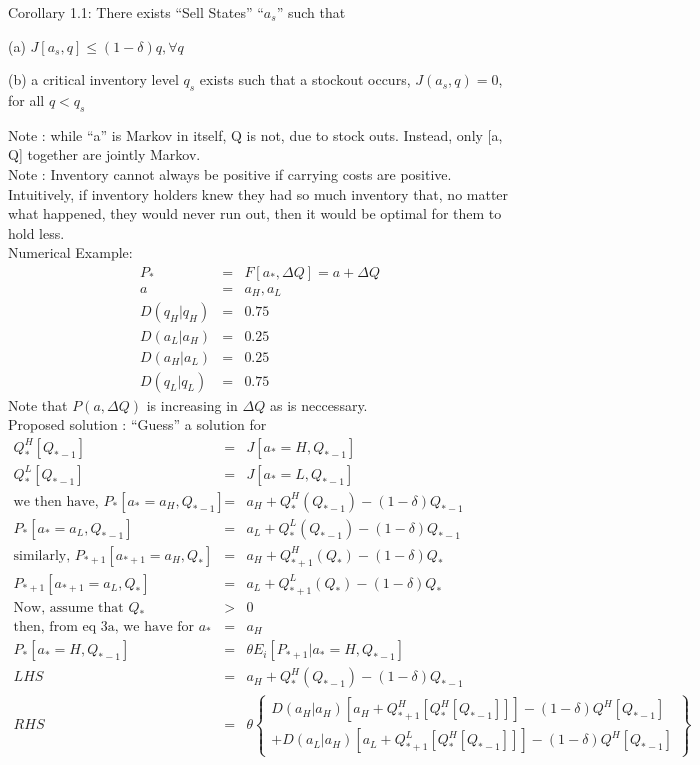 Corollary 1.1: There exists ``Sell States'' ``$a_s$'' such that
\begin{list}{}{}
\item (a) $J[a_s,q] \leq (1-\delta) q, \forall q$
\item (b) a critical inventory level $q_s$ exists such that a stockout occurs, $J(a_s,q) = 0$, for all $q<q_s$
\end{list}

Note : while ``a'' is Markov in itself, Q is not, due to stock outs. Instead, only [a, Q] together are jointly Markov.\\

Note : Inventory cannot always be positive if carrying costs are positive. Intuitively, if inventory holders knew they had so much inventory that, no matter what happened, they would never run out, then it would be optimal for them to hold less.\\

Numerical Example: 
\begin{eqnarray*}
P_* &=& F[a_*, \Delta Q] = a+\Delta Q\\
a &=& {a_H, a_L}\\
D(q_H \vert q_H) &=& 0.75\\
D(a_L \vert a_H) &=& 0.25\\
D(a_H \vert a_L) &=& 0.25\\
D(q_L \vert q_L) &=& 0.75
\end{eqnarray*}
Note that $P(a, \Delta Q)$ is increasing in $\Delta Q$ as is neccessary.\\

Proposed solution : ``Guess'' a solution for 
\begin{eqnarray*}
Q_* ^H [Q_{*-1}] &=& J[a_* = H, Q_{*-1}]\\
Q_* ^L [Q_{*-1}] &=& J[a_* = L, Q_{*-1}]\\
\mbox{we then have, } P_*[a_* = a_H, Q_{*-1}] &=& a_H + Q_* ^H (Q_{*-1}) - (1-\delta) Q_{*-1}\\
P_*[a_* = a_L, Q_{*-1}] &=& a_L + Q_* ^L (Q_{*-1}) - (1-\delta) Q_{*-1}\\
\mbox{similarly, } P_{*+1}[a_{*+1} = a_H, Q_{*}] &=& a_H + Q_{*+1} ^H (Q_*) - (1-\delta) Q_*\\
P_{*+1}[a_{*+1} = a_L, Q_*] &=& a_L + Q_{*+1} ^L (Q_*) - (1-\delta) Q_*\\
\mbox{Now, assume that } Q_* &>& 0\\
\mbox{then, from eq 3a, we have for } a_* &=& a_H\\
P_*[a_* = H, Q_{*-1}] &=& \theta E_i[P_{*+1}\vert a_* = H, Q_{*-1}]\\
LHS &=& a_H + Q_* ^H (Q_{*-1}) - (1-\delta) Q_{*-1}\\
RHS &=& \theta \left\{ \begin{array}{ll}
D(a_H\vert a_H) [a_H + Q_{*+1}^H [Q_* ^H [Q_{*-1}]]] - (1-\delta ) Q^H [Q_{*-1}]\\
+D(a_L\vert a_H) [a_L + Q_{*+1}^L [Q_* ^H [Q_{*-1}]]] - (1-\delta ) Q^H [Q_{*-1}] \end{array} \right\}
\end{eqnarray*}

